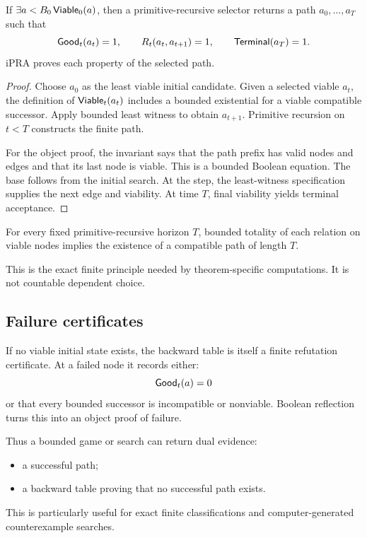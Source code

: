 \begin{theorem}
If \(\exists a<B_0\,\mathsf{Viable}_0(a)\), then a primitive-recursive selector returns
a path \(a_0,\ldots,a_T\) such that
\[
  \mathsf{Good}_t(a_t)=1,\qquad
  R_t(a_t,a_{t+1})=1,\qquad
  \mathsf{Terminal}(a_T)=1.
\]
iPRA proves each property of the selected path.
\end{theorem}

\begin{proof}
Choose \(a_0\) as the least viable initial candidate.  Given a selected viable
\(a_t\), the definition of \(\mathsf{Viable}_t(a_t)\) includes a bounded existential
for a viable compatible successor.  Apply bounded least witness to obtain
\(a_{t+1}\).  Primitive recursion on \(t<T\) constructs the finite path.

For the object proof, the invariant says that the path prefix has valid nodes
and edges and that its last node is viable.  This is a bounded Boolean
equation.  The base follows from the initial search.  At the step, the
least-witness specification supplies the next edge and viability.  At time
\(T\), final viability yields terminal acceptance.
\end{proof}

\begin{corollary}
For every fixed primitive-recursive horizon \(T\), bounded totality of each
relation on viable nodes implies the existence of a compatible path of length
\(T\).
\end{corollary}

This is the exact finite principle needed by theorem-specific computations.
It is not countable dependent choice.

\subsection{Failure certificates}

If no viable initial state exists, the backward table is itself a finite
refutation certificate.  At a failed node it records either:
\[
   \mathsf{Good}_t(a)=0
\]
or that every bounded successor is incompatible or nonviable.  Boolean
reflection turns this into an object proof of failure.

Thus a bounded game or search can return dual evidence:
\begin{itemize}
\item a successful path;
\item a backward table proving that no successful path exists.
\end{itemize}
This is particularly useful for exact finite classifications and
computer-generated counterexample searches.

